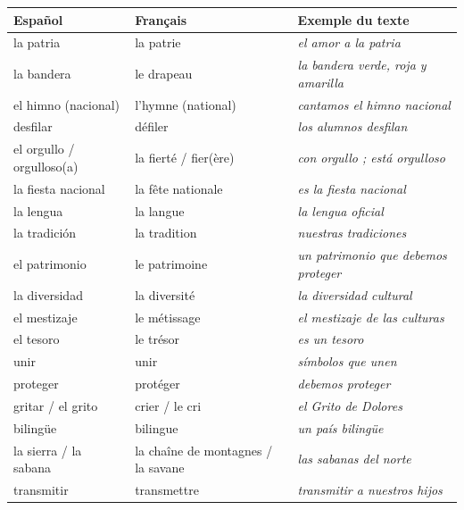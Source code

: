 \documentclass[11pt]{article}
\newcommand{\esp}[1]{\ifmmode\text{\textit{#1}}\else\begingroup\selectlanguage{spanish}\itshape #1\endgroup\fi}
\begin{document}
\begin{center}
\begin{tabularx}{\linewidth}{|X|X|X|}
\hline
\rowcolor{popblueL} \textbf{Español} & \textbf{Français} & \textbf{Exemple du texte} \\
\hline
la patria & la patrie & \esp{el amor a la patria} \\
\hline
la bandera & le drapeau & \esp{la bandera verde, roja y amarilla} \\
\hline
el himno (nacional) & l'hymne (national) & \esp{cantamos el himno nacional} \\
\hline
desfilar & défiler & \esp{los alumnos desfilan} \\
\hline
el orgullo / orgulloso(a) & la fierté / fier(ère) & \esp{con orgullo} ; \esp{está orgulloso} \\
\hline
la fiesta nacional & la fête nationale & \esp{es la fiesta nacional} \\
\hline
la lengua & la langue & \esp{la lengua oficial} \\
\hline
la tradición & la tradition & \esp{nuestras tradiciones} \\
\hline
el patrimonio & le patrimoine & \esp{un patrimonio que debemos proteger} \\
\hline
la diversidad & la diversité & \esp{la diversidad cultural} \\
\hline
el mestizaje & le métissage & \esp{el mestizaje de las culturas} \\
\hline
el tesoro & le trésor & \esp{es un tesoro} \\
\hline
unir & unir & \esp{símbolos que unen} \\
\hline
proteger & protéger & \esp{debemos proteger} \\
\hline
gritar / el grito & crier / le cri & \esp{el Grito de Dolores} \\
\hline
bilingüe & bilingue & \esp{un país bilingüe} \\
\hline
la sierra / la sabana & la chaîne de montagnes / la savane & \esp{las sabanas del norte} \\
\hline
transmitir & transmettre & \esp{transmitir a nuestros hijos} \\
\hline
\end{tabularx}
\end{center}
\end{document}
